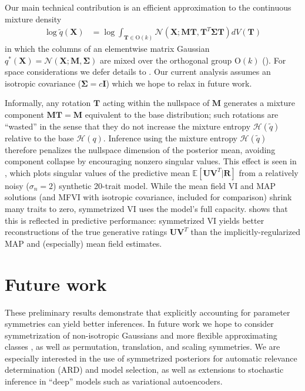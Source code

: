 \documentclass{article}
\newcommand{\N}{\mathcal{N}}
\newcommand{\E}{\mathbb{E}}
\renewcommand{\O}{\text{O}}
\renewcommand{\v}[1]{\mathbf{#1}}
\newcommand{\I}{\v{I}}
\begin{document}
\vspace{-0.5em}
Our main technical contribution is an efficient approximation to the continuous mixture density
\begin{align*}
\log \tilde{q}(\v{X}) &= \log \int_{\v{T}\in \O(k)} \N(\v{X}; \v{M}\v{T}, \v{T}^T\v{\Sigma} \v{T}) dV(\v{T})
\end{align*}
in which the columns of an elementwise matrix Gaussian $q^*(\v{X})=\N(\v{X}; \v{M}, \v{\Sigma})$ are
mixed over the orthogonal group $\O(k)$ (). For space considerations
we defer details to . Our current analysis
assumes an isotropic covariance ($\v{\Sigma}=c\I$) which we hope to relax in future work. 

Informally, any rotation $\v{T}$ acting within the nullspace of $\v{M}$
generates a mixture component $\v{M}\v{T}=\v{M}$ equivalent to the base distribution;
such rotations are ``wasted'' in the sense that they do not increase
the mixture entropy $\mathcal{H}(\tilde{q})$ relative to the base
$\mathcal{H}(q)$. Inference using the mixture entropy $\mathcal{H}(\tilde{q})$
therefore penalizes the nullspace dimension of the posterior mean, avoiding component collapse by encouraging nonzero singular values. This effect is seen in , which plots
singular values of the predictive mean $\E[\v{U}\v{V}^T | \v{R}]$ from a relatively noisy
($\sigma_n=2$) synthetic 20-trait model. While the mean field VI and MAP
solutions (and MFVI with isotropic covariance, included
for comparison) shrink many traits to zero, symmetrized VI uses
the model's full capacity.  shows that this is
reflected in predictive performance: symmetrized VI yields better
reconstructions of the true
generative ratings $\v{U}\v{V}^T$ than the implicitly-regularized MAP
and (especially) mean field estimates. 

\section{Future work}
\vspace{-0.5em}
These preliminary results demonstrate that explicitly accounting for
parameter symmetries can yield better inferences. In future work we
hope to consider symmetrization of non-isotropic Gaussians and
more flexible approximating classes
\citep{salimans2015markov,rezende2015variational,tran2016variational},
as well as permutation, translation, and scaling symmetries. We are
especially interested in the use of symmetrized posteriors for
automatic relevance determination (ARD) and model selection,
as well as extensions to stochastic inference in ``deep'' models
such as variational autoencoders.
\end{document}
